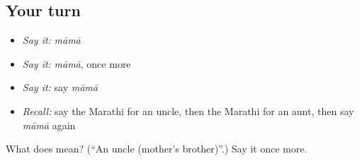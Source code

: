\subsection*{Your turn}
\begin{itemize}
\raggedright
  \item \emph{Say it:} \emph{māmā}
  \item \emph{Say it:} \emph{māmā}, once more
  \item \emph{Say it:} say \emph{māmā}
  \item \emph{Recall:} say the Marathi for an uncle, then the Marathi for an aunt, then say \emph{māmā} again
\end{itemize}

\begin{tcolorbox}[breakable,colback=teal!4,colframe=teal!35!black,title={Before you move on}]
What does  mean? (\textquotedblleft{}An uncle (mother's brother)\textquotedblright{}.) Say it once more.
\end{tcolorbox}
